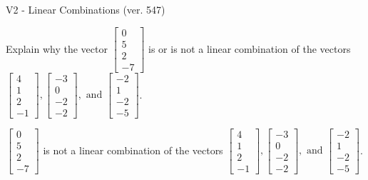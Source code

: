 \begin{exercise}
  \begin{exerciseTitle}V2 - Linear Combinations (ver. 547)\end{exerciseTitle}
  \begin{exerciseStatement}
    Explain why the vector \(\left[\begin{array}{c}
0 \\
5 \\
2 \\
-7
\end{array}\right]\)  is or is not a linear 
	combination of the vectors \(\left[\begin{array}{c}
4 \\
1 \\
2 \\
-1
\end{array}\right] , \left[\begin{array}{c}
-3 \\
0 \\
-2 \\
-2
\end{array}\right] , \text{ and } \left[\begin{array}{c}
-2 \\
1 \\
-2 \\
-5
\end{array}\right]\).
	


  \end{exerciseStatement}
  \begin{exerciseAnswer}
   \(\left[\begin{array}{c}
0 \\
5 \\
2 \\
-7
\end{array}\right]\) 
  	 is not  
	a linear combination of the vectors \(\left[\begin{array}{c}
4 \\
1 \\
2 \\
-1
\end{array}\right] , \left[\begin{array}{c}
-3 \\
0 \\
-2 \\
-2
\end{array}\right] , \text{ and } \left[\begin{array}{c}
-2 \\
1 \\
-2 \\
-5
\end{array}\right]\).

	
  


  \end{exerciseAnswer}
\end{exercise}